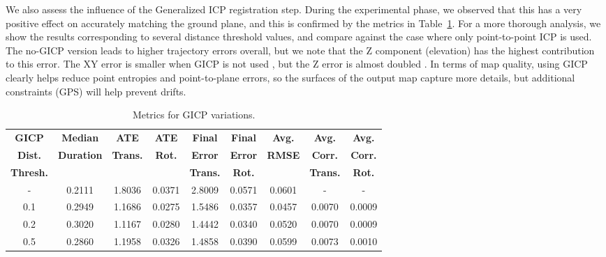 We also assess the influence of the Generalized ICP registration step. During the experimental phase, we observed that this has a very positive effect on accurately matching the ground plane, and this is confirmed by the metrics in Table~\ref{tab:gicp_variations}. For a more thorough analysis, we show the results corresponding to several distance threshold values, and compare against the case where only point-to-point ICP is used. The no-GICP version leads to higher trajectory errors overall, but we note that the Z component (elevation) has the highest contribution to this error. The XY error is smaller when GICP is not used , but the Z error is almost doubled . In terms of map quality, using GICP clearly helps reduce point entropies and point-to-plane errors, so the surfaces of the output map capture more details, but additional constraints (\ie GPS) will help prevent drifts.

\begin{table}[h]
    \centering
    \begin{tabular}{c|cccccccc}
        \hline
        \textbf{GICP}    & \textbf{Median}   & \textbf{ATE}    & \textbf{ATE}  & \textbf{Final } & \textbf{Final} & \textbf{Avg.} & \textbf{Avg.}   & \textbf{Avg.}  \\
        \textbf{Dist.}   & \textbf{Duration} & \textbf{Trans.} & \textbf{Rot.} & \textbf{Error}  & \textbf{Error} & \textbf{RMSE} & \textbf{Corr.}  & \textbf{Corr.} \\
        \textbf{Thresh.} &                   & \textbf{}       & \textbf{}     & \textbf{Trans.} & \textbf{Rot.}  & \textbf{}     & \textbf{Trans.} & \textbf{Rot.}  \\
        \hline \hline
        -                & 0.2111            & 1.8036          & 0.0371        & 2.8009          & 0.0571         & 0.0601        & -               & -              \\
        0.1              & 0.2949            & 1.1686          & 0.0275        & 1.5486          & 0.0357         & 0.0457        & 0.0070          & 0.0009         \\
        0.2              & 0.3020            & 1.1167          & 0.0280        & 1.4442          & 0.0340         & 0.0520        & 0.0070          & 0.0009         \\
        0.5              & 0.2860            & 1.1958          & 0.0326        & 1.4858          & 0.0390         & 0.0599        & 0.0073          & 0.0010         \\
        \hline
    \end{tabular}
    \caption{Metrics for GICP variations.}
    \label{tab:gicp_variations}
\end{table}


